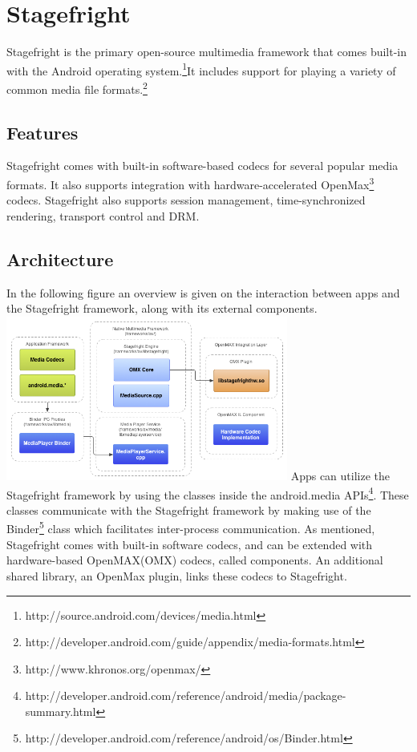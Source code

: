 \section{Stagefright}
Stagefright is the primary open-source multimedia framework that comes built-in with the Android operating system.\footnote{http://source.android.com/devices/media.html}It includes support for playing a variety of common media file formats.\footnote{http://developer.android.com/guide/appendix/media-formats.html}
\subsection{Features}
Stagefright comes with built-in software-based codecs for several popular media formats. It also supports integration with hardware-accelerated OpenMax\footnote{http://www.khronos.org/openmax/} codecs. Stagefright also supports session management, time-synchronized rendering, transport control and DRM.
\subsection{Architecture}
In the following figure an overview is given on the interaction between apps and the Stagefright framework, along with its external components.\\
\includegraphics[width=350px]{video_decoding/native.png}
Apps can utilize the Stagefright framework by using the classes inside the android.media APIs\footnote{http://developer.android.com/reference/android/media/package-summary.html}. These classes communicate with the Stagefright framework by making use of the Binder\footnote{http://developer.android.com/reference/android/os/Binder.html} class which facilitates inter-process communication. As mentioned, Stagefright comes with built-in software codecs, and can be extended with hardware-based OpenMAX(OMX) codecs, called components. An additional shared library, an OpenMax plugin, links these codecs to Stagefright.

